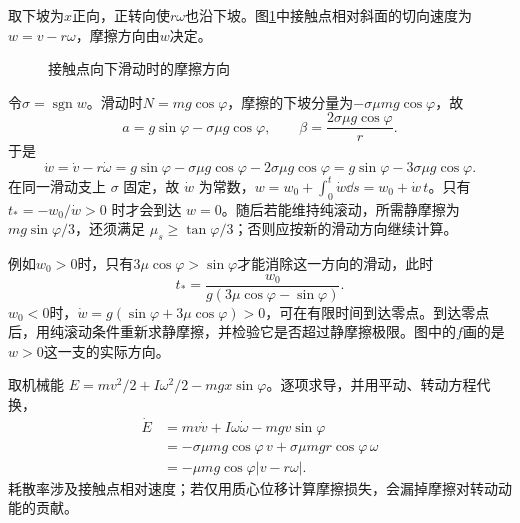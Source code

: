 \begin{solution}
取下坡为$x$正向，正转向使$r\omega$也沿下坡。图\ref{fig:hw1-7-s}中接触点相对斜面的切向速度为$w=v-r\omega$，摩擦方向由$w$决定。

\begin{figure}[H]\centering
{}
\caption{接触点向下滑动时的摩擦方向}\label{fig:hw1-7-s}
\end{figure}

令$\sigma=\operatorname{sgn}w$。滑动时$N=mg\cos\varphi$，摩擦的下坡分量为$-\sigma\mu mg\cos\varphi$，故
\[
 \boxed{a=g\sin\varphi-\sigma\mu g\cos\varphi,\qquad
 \beta=\frac{2\sigma\mu g\cos\varphi}{r}}.
\]
于是
\[
\dot w=\dot v-r\dot\omega
=g\sin\varphi-\sigma\mu g\cos\varphi-2\sigma\mu g\cos\varphi
=g\sin\varphi-3\sigma\mu g\cos\varphi.
\]
在同一滑动支上 $\sigma$ 固定，故 $\dot w$ 为常数，$w=w_0+\int_0^t\dot w\dd s=w_0+\dot w\,t$。只有 $t_*=-w_0/\dot w>0$ 时才会到达 $w=0$。随后若能维持纯滚动，所需静摩擦为 $mg\sin\varphi/3$，还须满足 $\mu_s\ge\tan\varphi/3$；否则应按新的滑动方向继续计算。

例如$w_0>0$时，只有$3\mu\cos\varphi>\sin\varphi$才能消除这一方向的滑动，此时
\[
 t_* =\frac{w_0}{g(3\mu\cos\varphi-\sin\varphi)}.
\]
$w_0<0$时，$\dot w=g(\sin\varphi+3\mu\cos\varphi)>0$，可在有限时间到达零点。到达零点后，用纯滚动条件重新求静摩擦，并检验它是否超过静摩擦极限。图中的$f$画的是$w>0$这一支的实际方向。

取机械能 $E=mv^2/2+I\omega^2/2-mgx\sin\varphi$。逐项求导，并用平动、转动方程代换，
\[
\begin{aligned}
\dot E&=mv\dot v+I\omega\dot\omega-mgv\sin\varphi\\
&=-\sigma\mu mg\cos\varphi\,v
+\sigma\mu mgr\cos\varphi\,\omega\\
&=-\mu mg\cos\varphi|v-r\omega|.
\end{aligned}
\]
耗散率涉及接触点相对速度；若仅用质心位移计算摩擦损失，会漏掉摩擦对转动动能的贡献。


\end{solution}



